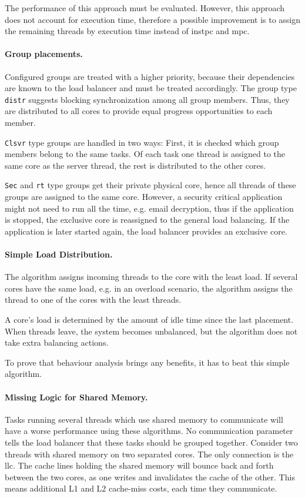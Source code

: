 The performance of this approach must be evaluated.
However, this approach does not account for execution time, therefore a
possible improvement is to assign the remaining threads by execution time
instead of \gls{instpc} and \gls{mpc}.


\paragraph{Group placements.}
Configured groups are treated with a higher priority, because their
dependencies are known to the load balancer and must be treated accordingly.
The group type \texttt{distr} suggests blocking synchronization among all group
members.
Thus, they are distributed to all cores to provide equal progress opportunities
to each member.

\texttt{Clsvr} type groups are handled in two ways: First, it is checked which
group members belong to the same tasks.
Of each task one thread is assigned to the same core as the server thread, the
rest is distributed to the other cores.

\texttt{Sec} and \texttt{rt} type groups get their private physical core, hence
all threads of these groups are assigned to the same core.
However, a security critical application might not need to run all the time,
e.g. email decryption, thus if the application is stopped, the exclusive core
is reassigned to the general load balancing.
If the application is later started again, the load balancer provides an
exclusive core.


\paragraph{Simple Load Distribution.}
The algorithm assigns incoming threads to the core with the least load.
If several cores have the same load, e.g. in an overload scenario, the
algorithm assigns the thread to one of the cores with the least threads.

A core's load is determined by the amount of idle time since the last
placement.
When threads leave, the system becomes unbalanced, but the algorithm does not
take extra balancing actions.

To prove that behaviour analysis brings any benefits, it has to beat
this simple algorithm.


\paragraph{Missing Logic for Shared Memory.}
Tasks running several threads which use shared memory to communicate will have
a worse performance using these algorithms.
No communication parameter tells the load balancer that these tasks should be
grouped together.
Consider two threads with shared memory on two separated cores.
The only connection is the \gls{llc}.
The cache lines holding the shared memory will bounce back and forth between
the two cores, as one writes and invalidates the cache of the other.
This means additional L1 and L2 cache-miss costs, each time they communicate.

